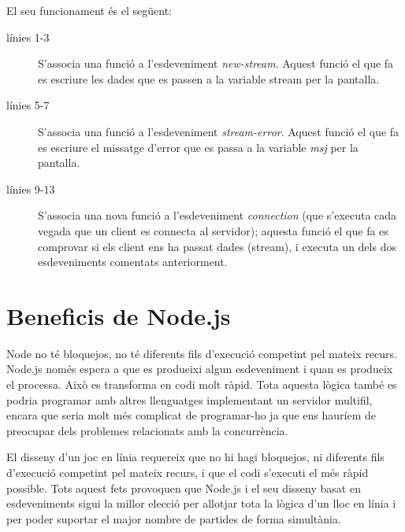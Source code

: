 El seu funcionament és el següent: 

\begin{description}
    \item[línies 1-3] {S'associa una funció a l'esdeveniment \emph{new-stream}. Aquest funció el que fa es escriure les dades que es passen a la variable stream per la pantalla.}
    \item[línies 5-7] {S'associa una funció a l'esdeveniment \emph{stream-error}. Aquest funció el que fa es escriure el missatge d'error que es passa a la variable \emph{msj} per la pantalla.}
  \item[línies 9-13] {S'associa una nova funció a l'esdeveniment \emph{connection} (que s'executa cada vegada que un client es connecta al servidor); aquesta funció el que fa es comprovar si els client ens ha passat dades (stream), i executa un dels dos esdeveniments comentats anteriorment.}
\end{description}

\section{Beneficis de Node.js}

Node no té bloquejos, no té diferents fils d'execució competint pel mateix recurs. Node.js només espera a que es produeixi algun esdeveniment i quan es produeix el processa. Això es transforma en codi molt ràpid. Tota aquesta lògica també es podria programar amb altres llenguatges implementant un servidor multifil, encara que seria molt més complicat de programar-ho ja que ens hauríem de preocupar dels problemes relacionats amb la concurrència. 

El disseny d'un joc en línia requereix que no hi hagi bloquejos, ni diferents fils d'execució competint pel mateix recurs, i que el codi s'executi el més ràpid possible. Tots aquest fets provoquen que Node.js i el seu disseny basat en esdeveniments sigui la millor elecció per allotjar tota la lògica d'un lloc en línia i per poder suportar el major nombre de partides de forma simultània.


